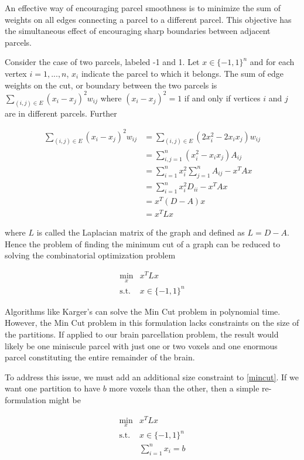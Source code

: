 An effective way of encouraging parcel smoothness is to minimize the sum
of weights on all edges connecting a parcel to a different parcel. This
objective has the simultaneous effect of encouraging sharp boundaries
between adjacent parcels.

Consider the case of two parcels, labeled -1 and 1. Let
$x \in \{-1, 1\}^n$ and for each vertex $i = 1,...,n$, $x_i$ indicate
the parcel to which it belongs. The sum of edge weights on the cut, or
boundary between the two parcels is
$\sum_{(i,j) \in E} (x_i - x_j)^2 w_{ij}$ where $(x_i - x_j)^2 = 1$ if
and only if vertices $i$ and $j$ are in different parcels. Further

\begin{align*}
\sum_{(i,j) \in E} (x_i - x_j)^2 w_{ij}
&= \sum_{(i,j) \in E} (2 x_i^2 - 2 x_i x_j) w_{ij} \\
&= \sum_{i,j = 1}^n (x_i^2 - x_i x_j) A_{ij} \\
&= \sum_{i = 1}^n x_i^2 \sum_{j = 1}^n A_{ij} - x^T A x \\
&= \sum_{i = 1}^n x_i^2 D_{ii} - x^T A x \\
&= x^T (D - A) x \\
&= x^T L x
\end{align*}

where $L$ is called the Laplacian matrix of the graph and defined as
$L = D - A$. Hence the problem of finding the minimum cut of a graph
can be reduced to solving the combinatorial optimization problem

\begin{equation} \label{mincut}
\begin{aligned}
\min_x      & x^T L x \\
\text{s.t.} & x \in \{-1, 1\}^n
\end{aligned}
\end{equation}

Algorithms like Karger's can solve the Min Cut problem in polynomial
time. However, the Min Cut problem in this formulation lacks
constraints on the size of the partitions. If applied to our brain
parcellation problem, the result would likely be one miniscule parcel
with just one or two voxels and one enormous parcel constituting the
entire remainder of the brain.

To address this issue, we must add an additional size constraint to
\ref{mincut}. If we want one partition to have $b$ more voxels than the
other, then a simple re-formulation might be

\begin{equation} \label{constrained_mincut}
\begin{aligned}
\min_x      & x^T L x \\
\text{s.t.} & x \in \{-1, 1\}^n \\
            & \sum_{i=1}^n x_i = b
\end{aligned}
\end{equation}

